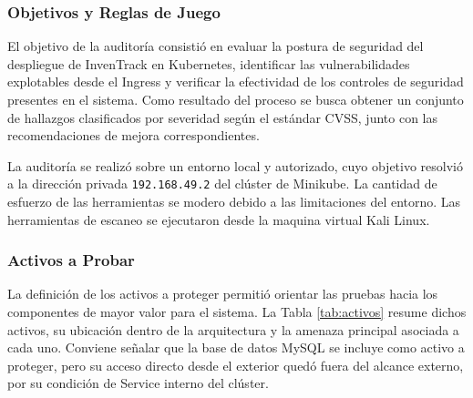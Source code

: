\documentclass[stu,11pt,spanish,floatsintext]{apa7}
\begin{document}
\subsubsection{Objetivos y Reglas de Juego}

El objetivo de la auditoría consistió en evaluar la postura de seguridad del despliegue de InvenTrack en Kubernetes, identificar las vulnerabilidades explotables desde el Ingress y verificar la efectividad de los controles de seguridad presentes en el sistema. Como resultado del proceso se busca obtener un conjunto de hallazgos clasificados por severidad según el estándar CVSS, junto con las recomendaciones de mejora correspondientes.

La auditoría se realizó sobre un entorno local y autorizado, cuyo objetivo resolvió a la dirección privada \texttt{192.168.49.2} del clúster de Minikube. La cantidad de esfuerzo de las herramientas se modero debido a las limitaciones del entorno. Las herramientas de escaneo se ejecutaron desde la maquina virtual Kali Linux.

\subsubsection{Activos a Probar}

La definición de los activos a proteger permitió orientar las pruebas hacia los componentes de mayor valor para el sistema. La Tabla \ref{tab:activos} resume dichos activos, su ubicación dentro de la arquitectura y la amenaza principal asociada a cada uno. Conviene señalar que la base de datos MySQL se incluye como activo a proteger, pero su acceso directo desde el exterior quedó fuera del alcance externo, por su condición de Service interno del clúster.
\end{document}

